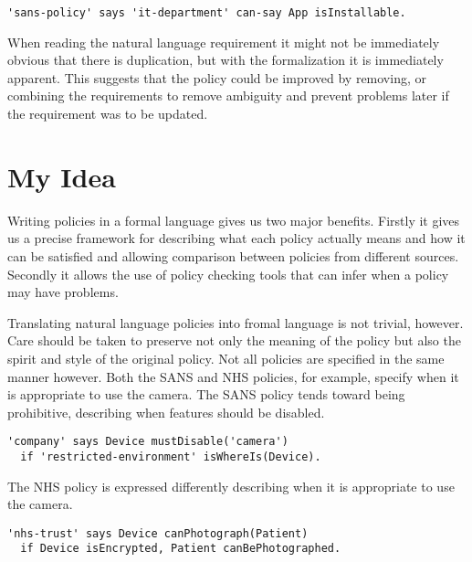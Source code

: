\documentclass[a4paper]{article}
\begin{document}
\begin{lstlisting}[title={\footnotesize\textbf{SANS}:~\itshape 
``Only approved third party applications can be
installed on handhelds. The approved list can be
obtained by contacting the IT department, or should be
available on the intranet.''}]
'sans-policy' says 'it-department' can-say App isInstallable.
\end{lstlisting}

When reading the natural language requirement it might not be immediately obvious that there is duplication, but with the formalization it is immediately apparent.  This suggests that the policy could be improved by removing, or combining the requirements to remove ambiguity and prevent problems later if the requirement was to be updated.

\section{My Idea}
\label{sec:idea}

Writing policies in a formal language gives us two major benefits. 
Firstly it gives us a precise framework for describing what each policy actually means and how it can be satisfied and allowing comparison between policies from different sources.  Secondly it allows the use of policy checking tools that can infer when a policy may have problems.

Translating natural language policies into fromal language is not trivial, however.
Care should be taken to preserve not only the meaning of the policy but also the spirit and style of the original policy.
Not all policies are specified in the same manner however. 
Both the SANS and NHS policies, for example, specify when it is appropriate to use the camera.
The SANS policy tends toward being prohibitive, describing when features should be disabled.
\begin{lstlisting}[title={\footnotesize\textbf{SANS}:~\itshape
``Digital camera embedded on handheld devices might be
disabled in restricted environments, according to Company risk analysis.}]
'company' says Device mustDisable('camera') 
  if 'restricted-environment' isWhereIs(Device).
\end{lstlisting}
The NHS policy is expressed differently describing when it is appropriate to use the camera.
\begin{lstlisting}[title={\footnotesize\textbf{NHS}:~\itshape
  ``Some mobile devices have the ability to take photographs~/~videos. This
  function should not be used for photographs~/~videos of an individual's
  care and treatment unless the device has encryption enabled and it is
  clinically appropriate to do so.''}]
'nhs-trust' says Device canPhotograph(Patient)
  if Device isEncrypted, Patient canBePhotographed.
\end{lstlisting}
\end{document}
